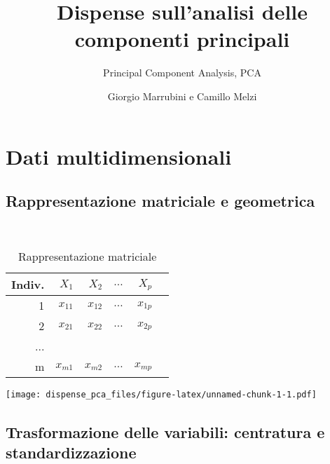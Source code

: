 \documentclass[
  11pt,
]{book}
\title{Dispense sull'analisi delle componenti principali}
\subtitle{Principal Component Analysis, PCA}
\author{Giorgio Marrubini e Camillo Melzi}
\date{}
\begin{document}
\maketitle

{
\hypersetup{linkcolor=}
\setcounter{tocdepth}{1}
\tableofcontents
}
\hypertarget{section}{%
\chapter*{}\label{section}}

\hypertarget{dati-multidimensionali}{%
\chapter{Dati multidimensionali}\label{dati-multidimensionali}}

\hypertarget{rappresentazione-matriciale-e-geometrica}{%
\section{Rappresentazione matriciale e geometrica}\label{rappresentazione-matriciale-e-geometrica}}

\begin{table}[h]
\caption{Rappresentazione matriciale}
\label{tab:RegrMult}
\ 
\begin{center}
\begin{tabular}{rrrrrr}
\hline
Indiv. & $X_1$ & $X_2$ & $\dots$ & $X_p$ \\
\hline
1 & $x_{11}$ & $x_{12}$ & $\dots$ & $x_{1p}$\\
2 & $x_{21}$ & $x_{22}$ & $\dots$ & $x_{2p}$ \\
...\\
m & $x_{m1}$ & $x_{m2}$ & $\dots$ & $x_{mp}$ \\
\hline
\end{tabular}
\end{center}
\end{table}

\texttt{[image: dispense\_pca\_files/figure-latex/unnamed-chunk-1-1.pdf]}

\hypertarget{trasformazione-delle-variabili-centratura-e-standardizzazione}{%
\section{Trasformazione delle variabili: centratura e standardizzazione}\label{trasformazione-delle-variabili-centratura-e-standardizzazione}}
\end{document}
